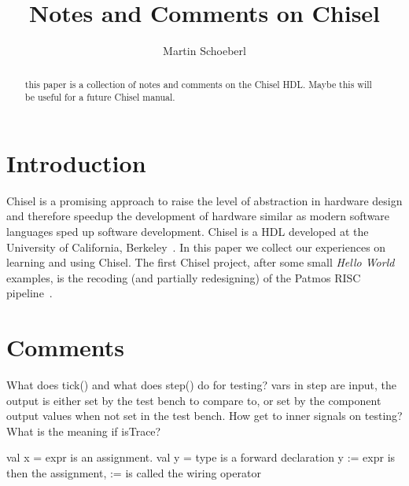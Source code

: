 \documentclass[a4paper, conference]{IEEEtran}
\begin{document}
\title{Notes and Comments on Chisel}

\author{Martin Schoeberl}




\maketitle \thispagestyle{empty}

\begin{abstract}
this paper is a collection of notes and comments on the Chisel HDL.
Maybe this will be useful for a future Chisel manual.
\end{abstract}


\section{Introduction}
\label{sec:intro}

Chisel is a promising approach to raise the level of abstraction in
hardware design and therefore speedup the development of hardware
similar as modern software languages sped up software development.
Chisel is a HDL developed at the University of California, Berkeley~\cite{chisel:dac2012}.
In this paper we collect our experiences on learning and using Chisel.
The first Chisel project, after some small \emph{Hello World} examples,
is the recoding (and partially redesigning) of the Patmos RISC pipeline~\cite{patmos:ppes2011}.
\section{Comments}

What does tick() and what does step() do for testing?
  vars in step are input, the output is either set by the test bench to compare to, or set by the component output values when not set in the test bench.
How get to inner signals on testing?
What is the meaning if isTrace?

val x = expr is an assignment.
val y = type is a forward declaration
y := expr is then the assignment, := is called the wiring operator
\end{document}
